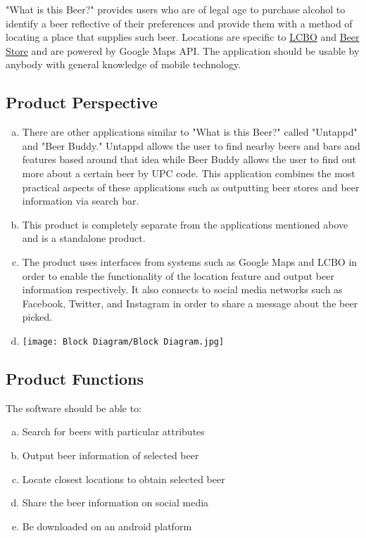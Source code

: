 \documentclass[]{article}
\begin{document}
"What is this Beer?" provides users who are of legal age to purchase alcohol to identify a beer reflective of their preferences and provide them with a method of locating a place that supplies such beer. Locations are specific to \underline{LCBO} and \underline{Beer Store} and are powered by Google Maps API. The application should be usable by anybody with general knowledge of mobile technology. \\


\subsection{Product Perspective}
\label{sub:product_perspective}
\begin{enumerate}[a)]
	\item There are other applications similar to "What is this Beer?" called "Untappd" and "Beer Buddy." Untappd allows the user to find nearby beers and bars and features based around that idea while Beer Buddy allows the user to find out more about a certain beer by UPC code. This application combines the most practical aspects of these applications such as outputting beer stores and beer information via search bar. 
	\item This product is completely separate from the applications mentioned above and is a standalone product.
	\item The product uses interfaces from systems such as Google Maps and LCBO in order to enable the functionality of the location feature and output beer information respectively. It also connects to social media networks such as Facebook, Twitter, and Instagram in order to share a message about the beer picked.
	\item 

		\texttt{[image: Block Diagram/Block Diagram.jpg]}

	
\end{enumerate}

\subsection{Product Functions}
\label{sub:product_functions}

The software should be able to:
\begin{enumerate}[a)]

\item Search for beers with particular attributes
\item Output beer information of selected beer
\item Locate closest locations to obtain selected beer
\item Share the beer information on social media 
\item Be downloaded on an android platform
	
	
\end{enumerate}
\end{document}
